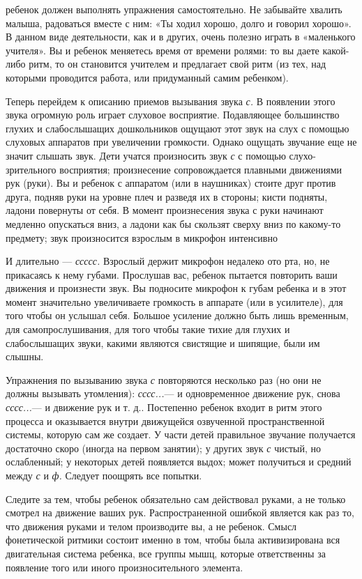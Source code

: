 \documentclass[a5paper]{book}
\renewcommand{\emph}[1]{\textit{#1}}
\begin{document}
ребенок должен выполнять упражнения самостоятельно. Не забывайте хвалить
малыша, радоваться вместе с ним: «Ты ходил хорошо, долго и говорил
хорошо». В данном виде деятельности, как и в других, очень полезно
играть в «маленького учителя». Вы и ребенок меняетесь время от времени
ролями: то вы даете какой-либо ритм, то он становится учителем и
предлагает свой ритм (из тех, над которыми проводится работа, или
придуманный самим ребенком).

Теперь перейдем к описанию приемов вызывания звука \emph{с.} В появлении
этого звука огромную роль играет слуховое восприятие. Подавляющее
большинство глухих и слабослышащих дошкольников ощущают этот звук на
слух с помощью слуховых аппаратов при увеличении громкости. Однако
ощущать звучание еще не значит слышать звук. Дети учатся произносить
звук \emph{с} с помощью слухо-зрительного восприятия; произнесение
сопровождается плавными движениями рук (руки). Вы и ребенок с аппаратом
(или в наушниках) стоите друг против друга, подняв руки на уровне плеч и
разведя их в стороны; кисти подняты, ладони повернуты от себя. В момент
произнесения звука с руки начинают медленно опускаться вниз, а ладони
как бы скользят сверху вниз по какому-то предмету; звук произносится
взрослым в микрофон интенсивно

И длительно --- \emph{ссссс.} Взрослый держит микрофон недалеко ото рта,
но, не прикасаясь к нему губами. Прослушав вас, ребенок пытается
повторить ваши движения и произнести звук. Вы подносите микрофон к губам
ребенка и в этот момент значительно увеличиваете громкость в аппарате
(или в усилителе), для того чтобы он услышал себя. Большое усиление
должно быть лишь временным, для самопрослушивания, для того чтобы такие
тихие для глухих и слабослышащих звуки, какими являются свистящие и
шипящие, были им слышны.

Упражнения по вызыванию звука \emph{с} повторяются несколько раз (но они
не должны вызывать утомления): \emph{сссс...}--- и одновременное
движение рук, снова \emph{сссс...}--- и движение рук и т. д.. Постепенно
ребенок входит в ритм этого процесса и оказывается внутри движущейся
озвученной пространственной системы, которую сам же создает. У части
детей правильное звучание получается достаточно скоро (иногда на первом
занятии); у других звук \emph{с} чистый, но ослабленный; у некоторых
детей появляется выдох; может получиться и средний между \emph{с} и
\emph{ф.} Следует поощрять все попытки.

Следите за тем, чтобы ребенок обязательно сам действовал руками, а не
только смотрел на движение ваших рук. Распространенной ошибкой является
как раз то, что движения руками и телом производите вы, а не ребенок.
Смысл фонетической ритмики состоит именно в том, чтобы была
активизирована вся двигательная система ребенка, все группы мышц,
которые ответственны за появление того или иного произносительного
элемента.
\end{document}
